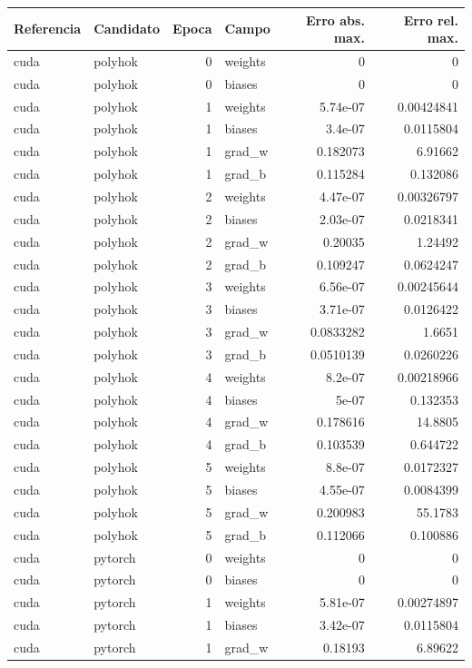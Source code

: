 \begin{tabular}{llrlrr}
\hline
Referencia & Candidato & Epoca & Campo & Erro abs. max. & Erro rel. max. \\
\hline
cuda & polyhok & 0 & weights & 0 & 0 \\
cuda & polyhok & 0 & biases & 0 & 0 \\
cuda & polyhok & 1 & weights & 5.74e-07 & 0.00424841 \\
cuda & polyhok & 1 & biases & 3.4e-07 & 0.0115804 \\
cuda & polyhok & 1 & grad\_w & 0.182073 & 6.91662 \\
cuda & polyhok & 1 & grad\_b & 0.115284 & 0.132086 \\
cuda & polyhok & 2 & weights & 4.47e-07 & 0.00326797 \\
cuda & polyhok & 2 & biases & 2.03e-07 & 0.0218341 \\
cuda & polyhok & 2 & grad\_w & 0.20035 & 1.24492 \\
cuda & polyhok & 2 & grad\_b & 0.109247 & 0.0624247 \\
cuda & polyhok & 3 & weights & 6.56e-07 & 0.00245644 \\
cuda & polyhok & 3 & biases & 3.71e-07 & 0.0126422 \\
cuda & polyhok & 3 & grad\_w & 0.0833282 & 1.6651 \\
cuda & polyhok & 3 & grad\_b & 0.0510139 & 0.0260226 \\
cuda & polyhok & 4 & weights & 8.2e-07 & 0.00218966 \\
cuda & polyhok & 4 & biases & 5e-07 & 0.132353 \\
cuda & polyhok & 4 & grad\_w & 0.178616 & 14.8805 \\
cuda & polyhok & 4 & grad\_b & 0.103539 & 0.644722 \\
cuda & polyhok & 5 & weights & 8.8e-07 & 0.0172327 \\
cuda & polyhok & 5 & biases & 4.55e-07 & 0.0084399 \\
cuda & polyhok & 5 & grad\_w & 0.200983 & 55.1783 \\
cuda & polyhok & 5 & grad\_b & 0.112066 & 0.100886 \\
cuda & pytorch & 0 & weights & 0 & 0 \\
cuda & pytorch & 0 & biases & 0 & 0 \\
cuda & pytorch & 1 & weights & 5.81e-07 & 0.00274897 \\
cuda & pytorch & 1 & biases & 3.42e-07 & 0.0115804 \\
cuda & pytorch & 1 & grad\_w & 0.18193 & 6.89622 \\

\end{tabular}
